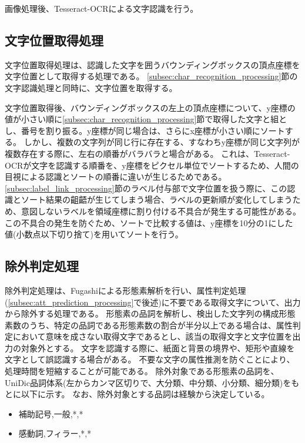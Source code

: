 画像処理後、Tesseract-OCRによる文字認識を行う。

\subsection{文字位置取得処理}\label{subsec:char_position_obtainment_processing}
文字位置取得処理は、認識した文字を囲うバウンディングボックスの頂点座標を文字位置として取得する処理である。
\ref{subsec:char_recognition_processing}節の文字認識処理と同時に、文字位置を取得する。

文字位置取得後、バウンディングボックスの左上の頂点座標について、y座標の値が小さい順に\ref{subsec:char_recognition_processing}節で取得した文字と組とし、番号を割り振る。y座標が同じ場合は、さらにx座標が小さい順にソートする。
しかし、複数の文字列が同じ行に存在する、すなわちy座標が同じ文字列が複数存在する際に、左右の順番がバラバラと場合がある。
これは、Tesseract-OCRが文字を認識する順番を、y座標をピクセル単位でソートするため、人間の目視による認識とソートの順番に違いが生じるためである。
\ref{subsec:label_link_processing}節のラベル付与部で文字位置を扱う際に、この認識とソート結果の齟齬が生じてしまう場合、ラベルの更新順が変化してしまうため、意図しないラベルを領域座標に割り付ける不具合が発生する可能性がある。
この不具合の発生を防ぐため、ソートで比較する値は、y座標を10分の1にした値(小数点以下切り捨て)を用いてソートを行う。


\subsection{除外判定処理}\label{subsec:exclusion_judgement_processing}
除外判定処理は、Fugashiによる形態素解析を行い、属性判定処理(\ref{subsec:att_prediction_processing}で後述)に不要である取得文字について、出力から除外する処理である。
形態素の品詞を解析し、検出した文字列の構成形態素数のうち、特定の品詞である形態素数の割合が半分以上である場合は、属性判定において意味を成さない取得文字であるとし、該当の取得文字と文字位置を出力の対象外とする。
文字を認識する際に、紙面と背景の境界や、矩形や直線を文字として誤認識する場合がある。
不要な文字の属性推測を防ぐことにより、処理時間を短縮することが可能である。
除外対象である形態素の品詞を、UniDic品詞体系(左からカンマ区切りで、大分類、中分類、小分類、細分類)をもとに以下に示す。
なお、除外対象とする品詞は経験から決定している。

\begin{itemize}
    \item 補助記号,一般,*,*
    \item 感動詞,フィラー,*,*
\end{itemize}


